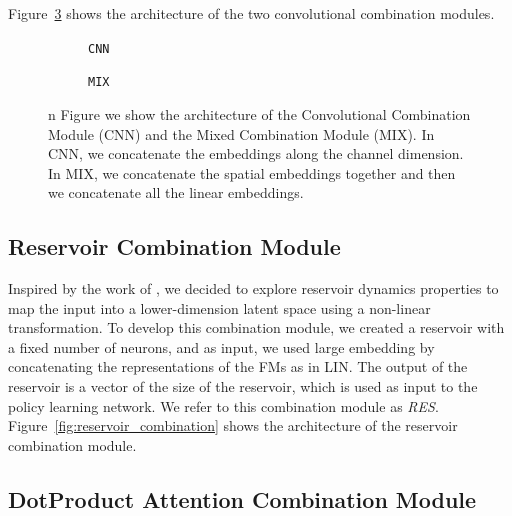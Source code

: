 Figure~\ref{fig:conv_combination} shows the architecture of the two convolutional combination modules.

\begin{figure}[ht]
    \centering
    \begin{subfigure}[b]{0.47\textwidth}
        \centering
        \fbox{\rule[-.5cm]{0cm}{4cm} \rule[-.5cm]{4cm}{0cm}}
        \caption{\texttt{CNN}}
        \label{fig:cnn}
    \end{subfigure}
    \hfill
    \begin{subfigure}[b]{0.47\textwidth}
        \centering
        \fbox{\rule[-.5cm]{0cm}{4cm} \rule[-.5cm]{4cm}{0cm}}
        \caption{\texttt{MIX}}
        \label{fig:mix}
    \end{subfigure}

    \caption{n Figure we show the architecture of the Convolutional Combination Module (CNN) and the Mixed Combination Module (MIX). In CNN, we concatenate the embeddings along the channel dimension. In MIX, we concatenate the spatial embeddings together and then we concatenate all the linear embeddings.}
    \label{fig:conv_combination}
\end{figure}

\subsection{Reservoir Combination Module}
\label{subsec:reservoir_combination}
Inspired by the work of \citet{gallicchio2017}, we decided to explore reservoir dynamics properties to map the input into a lower-dimension latent space using a non-linear transformation.
To develop this combination module, we created a reservoir with a fixed number of neurons, and as input, we used large embedding by concatenating the representations of the FMs as in LIN\@.
The output of the reservoir is a vector of the size of the reservoir, which is used as input to the policy learning network.
We refer to this combination module as \textit{RES}.
Figure~\ref{fig:reservoir_combination} shows the architecture of the reservoir combination module.

\subsection{DotProduct Attention Combination Module}
\label{subsec:dpa}

